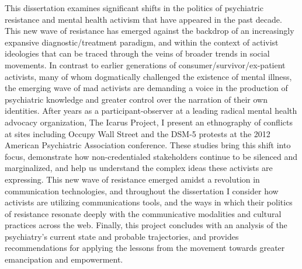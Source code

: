 %


This dissertation examines significant shifts in the politics of psychiatric resistance and mental health activism that have appeared in the past decade. This new wave of resistance has emerged against the backdrop of an increasingly expansive diagnostic/treatment paradigm, and within the context of activist ideologies that can be traced through the veins of broader trends in social movements. In contrast to earlier generations of consumer/survivor/ex-patient activists, many of whom dogmatically challenged the existence of mental illness, the emerging wave of mad activists are demanding a voice in the production of psychiatric knowledge and greater control over the narration of their own identities. After years as a participant-observer at a leading radical mental health advocacy organization, The Icarus Project, I present an ethnography of conflicts at sites including Occupy Wall Street and the DSM-5 protests at the 2012 American Psychiatric Association conference. These studies bring this shift into focus, demonstrate how non-credentialed stakeholders continue to be silenced and marginalized, and help us understand the complex ideas these activists are expressing. This new wave of resistance emerged amidst a revolution in communication technologies, and throughout the dissertation I consider how activists are utilizing communications tools, and the ways in which their politics of resistance resonate deeply with the communicative modalities and cultural practices across the web. Finally, this project concludes with an analysis of the psychiatry’s current state and probable trajectories, and provides recommendations for applying the lessons from the movement towards greater emancipation and empowerment.


